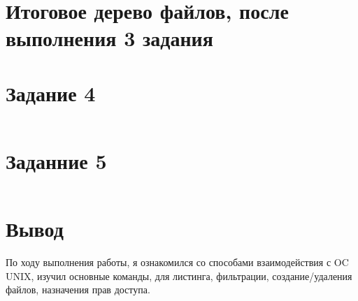 \documentclass[12pt,onecolumn]{article}
\begin{document}
\section{Итоговое дерево файлов, после выполнения 3 задания}
\newpage
\section{Задание 4}
\inputminted{sh}{code/4.sh}
\newpage
\section{Заданние 5}
\inputminted{sh}{code/5.sh}
\newpage
\section{Вывод}
По ходу выполнения работы,  я ознакомился со способами взаимодействия с OC UNIX, изучил основные команды, для листинга, фильтрации, создание/удаления файлов, назначения прав доступа.
\end{document}
